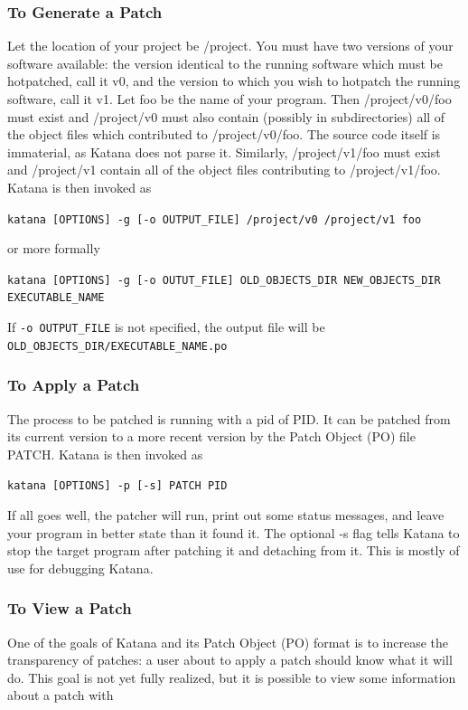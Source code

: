 \documentclass[11pt]{article}
\begin{document}
\subsubsection{To Generate a Patch}
\label{sec-3.5.4}

    Let the location of your project be /project. You must have two
    versions of your software available: the version identical to the
    running software which must be hotpatched, call it v0, and the
    version to which you wish to hotpatch the running software, call it
    v1. Let foo be the name of your program. Then /project/v0/foo must
    exist and /project/v0 must also contain (possibly in
    subdirectories) all of the object files which contributed to
    /project/v0/foo. The source code itself is immaterial, as Katana
    does not parse it. Similarly, /project/v1/foo must exist and
    /project/v1 contain all of the object files contributing to
    /project/v1/foo. Katana is then invoked as

    \texttt{katana [OPTIONS] -g [-o OUTPUT\_FILE] /project/v0 /project/v1 foo}

    or more formally

    \texttt{katana [OPTIONS] -g [-o OUTUT\_FILE] OLD\_OBJECTS\_DIR NEW\_OBJECTS\_DIR EXECUTABLE\_NAME}

    If \texttt{-o OUTPUT\_FILE} is not specified, the output file will be \texttt{OLD\_OBJECTS\_DIR/EXECUTABLE\_NAME.po}
\subsubsection{To Apply a Patch}
\label{sec-3.5.5}

    The process to be patched is running with a pid of PID. It can be
    patched from its current version to a more recent version by the
    Patch Object (PO) file PATCH. Katana is then invoked as

    \texttt{katana [OPTIONS] -p [-s] PATCH PID}

    If all goes well, the patcher will run, print out some status
    messages, and leave your program in better state than it found
    it. The optional -s flag tells Katana to stop the target program
    after patching it and detaching from it. This is mostly of use for
    debugging Katana.
\subsubsection{To View a Patch}
\label{sec-3.5.6}

    One of the goals of Katana and its Patch Object (PO) format is to
    increase the transparency of patches: a user about to apply a patch
    should know what it will do. This goal is not yet fully realized,
    but it is possible to view some information about a patch with
\end{document}
